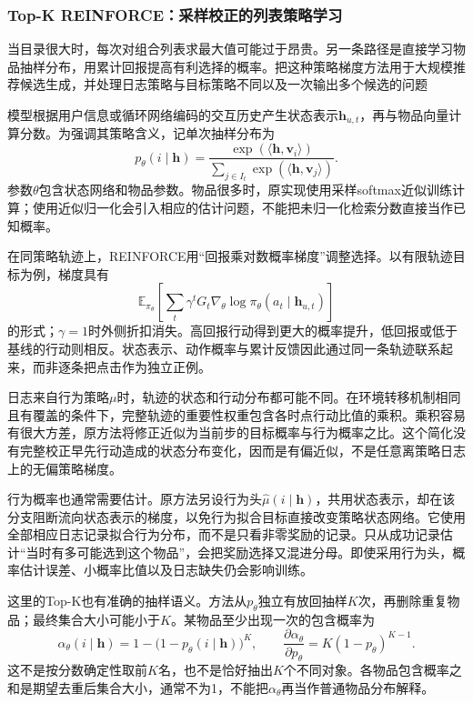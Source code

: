 \subsubsection{Top-K REINFORCE：采样校正的列表策略学习}
\label{sec:rs-topk-reinforce}

当目录很大时，每次对组合列表求最大值可能过于昂贵。另一条路径是直接学习物品抽样分布，用累计回报提高有利选择的概率。把这种策略梯度方法用于大规模推荐候选生成，并处理日志策略与目标策略不同以及一次输出多个候选的问题

模型根据用户信息或循环网络编码的交互历史产生状态表示$\bm{h}_{u,t}$，再与物品向量计算分数。为强调其策略含义，记单次抽样分布为
\[
 p_\theta(i\mid\bm{h})
 =\frac{\exp(\langle\bm{h},\bm{v}_i\rangle)}
        {\sum_{j\in I_t}\exp(\langle\bm{h},\bm{v}_j\rangle)}.
\]
参数$\theta$包含状态网络和物品参数。物品很多时，原实现使用采样softmax近似训练计算；使用近似归一化会引入相应的估计问题，不能把未归一化检索分数直接当作已知概率。

在同策略轨迹上，REINFORCE用“回报乘对数概率梯度”调整选择。以有限轨迹目标为例，梯度具有
\[
 \mathbb{E}_{\pi_\theta}
 \left[\sum_t\gamma^t G_t
       \nabla_\theta\log\pi_\theta(a_t\mid\bm{h}_{u,t})\right]
\]
的形式；$\gamma=1$时外侧折扣消失。高回报行动得到更大的概率提升，低回报或低于基线的行动则相反。状态表示、动作概率与累计反馈因此通过同一条轨迹联系起来，而非逐条把点击作为独立正例。

日志来自行为策略$\mu$时，轨迹的状态和行动分布都可能不同。在环境转移机制相同且有覆盖的条件下，完整轨迹的重要性权重包含各时点行动比值的乘积。乘积容易有很大方差，原方法将修正近似为当前步的目标概率与行为概率之比。这个简化没有完整校正早先行动造成的状态分布变化，因而是有偏近似，不是任意离策略日志上的无偏策略梯度。

行为概率也通常需要估计。原方法另设行为头$\widehat\mu(i\mid\bm{h})$，共用状态表示，却在该分支阻断流向状态表示的梯度，以免行为拟合目标直接改变策略状态网络。它使用全部相应日志记录拟合行为分布，而不是只看非零奖励的记录。只从成功记录估计“当时有多可能选到这个物品”，会把奖励选择又混进分母。即使采用行为头，概率估计误差、小概率比值以及日志缺失仍会影响训练。

这里的Top-K也有准确的抽样语义。方法从$p_\theta$独立有放回抽样$K$次，再删除重复物品；最终集合大小可能小于$K$。某物品至少出现一次的包含概率为
\begin{equation}
 \alpha_\theta(i\mid\bm{h})
 =1-\bigl(1-p_\theta(i\mid\bm{h})\bigr)^K,
 \qquad
 \frac{\partial\alpha_\theta}{\partial p_\theta}
 =K(1-p_\theta)^{K-1}.
 \label{eq:rs-topk-inclusion}
\end{equation}
这不是按分数确定性取前$K$名，也不是恰好抽出$K$个不同对象。各物品包含概率之和是期望去重后集合大小，通常不为1，不能把$\alpha_\theta$再当作普通物品分布解释。

